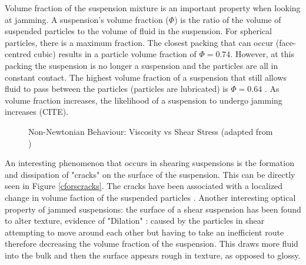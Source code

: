 \documentclass[twoside,a4]{report}
\begin{document}
	Volume fraction of the suspension mixture is an important property when looking at jamming. A suspension's volume fraction (\( \Phi \)) is the ratio of the volume of suspended particles to the volume of fluid in the suspension. For spherical particles, there is a maximum fraction. The closest packing that can occur (face-centred cubic) results in a particle volume fraction of \( \Phi = 0.74 \). However, at this packing the suspension is no longer a suspension and the particles are all in constant contact. The highest volume fraction of a suspension that still allows fluid to pass between the particles (particles are lubricated) is \( \Phi = 0.64 \) \cite{backguypoonjam}. As volume fraction increases, the likelihood of a suspension to undergo jamming increases (CITE).
	\begin{figure}[!htb]
		\centering
		\label{figshearthinthick}
		\caption{Non-Newtonian Behaviour: Viscosity vs Shear Stress (adapted from \cite{figshearthin, figshearthick})}
	\end{figure} \newline  \noindent
	An interesting phenomenon that occurs in shearing suspensions is the formation and dissipation of "cracks" on the surface of the suspension. This can be directly seen in Figure \ref{cforscracks}. The cracks have been associated with a localized change in volume faction of the suspended particles \cite{backhawjam}. Another interesting optical property of jammed suspensions: the surface of a shear suspension has been found to alter texture, evidence of "Dilation" \cite{backbrownjaegrev}: caused by the particles in shear attempting to move around each other but having to take an inefficient route therefore decreasing the volume fraction of the suspension. This draws more fluid into the bulk and then the surface appears rough in texture, as opposed to glossy. 
\end{document}
